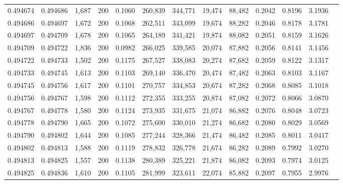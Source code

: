 \begin{tabular}{rrrrrrrrrrrrr}
0.494674 & 0.494686 & 1,687 & 200 &                                     0.1060 & 260,839 & 344,771 &  19,474 &  88,482 & 0.2042 & 0.8196 & 3.1936 \\
0.494686 & 0.494697 & 1,672 & 200 &                                     0.1068 & 262,511 & 343,099 &  19,674 &  88,282 & 0.2046 & 0.8178 & 3.1781 \\
0.494697 & 0.494709 & 1,678 & 200 &                                     0.1065 & 264,189 & 341,421 &  19,874 &  88,082 & 0.2051 & 0.8159 & 3.1626 \\
0.494709 & 0.494722 & 1,836 & 200 &                                     0.0982 & 266,025 & 339,585 &  20,074 &  87,882 & 0.2056 & 0.8141 & 3.1456 \\
0.494722 & 0.494733 & 1,502 & 200 &                                     0.1175 & 267,527 & 338,083 &  20,274 &  87,682 & 0.2059 & 0.8122 & 3.1317 \\
0.494733 & 0.494745 & 1,613 & 200 &                                     0.1103 & 269,140 & 336,470 &  20,474 &  87,482 & 0.2063 & 0.8103 & 3.1167 \\
0.494745 & 0.494756 & 1,617 & 200 &                                     0.1101 & 270,757 & 334,853 &  20,674 &  87,282 & 0.2068 & 0.8085 & 3.1018 \\
0.494756 & 0.494767 & 1,598 & 200 &                                     0.1112 & 272,355 & 333,255 &  20,874 &  87,082 & 0.2072 & 0.8066 & 3.0870 \\
0.494767 & 0.494778 & 1,580 & 200 &                                     0.1124 & 273,935 & 331,675 &  21,074 &  86,882 & 0.2076 & 0.8048 & 3.0723 \\
0.494778 & 0.494790 & 1,665 & 200 &                                     0.1072 & 275,600 & 330,010 &  21,274 &  86,682 & 0.2080 & 0.8029 & 3.0569 \\
0.494790 & 0.494802 & 1,644 & 200 &                                     0.1085 & 277,244 & 328,366 &  21,474 &  86,482 & 0.2085 & 0.8011 & 3.0417 \\
0.494802 & 0.494813 & 1,588 & 200 &                                     0.1119 & 278,832 & 326,778 &  21,674 &  86,282 & 0.2089 & 0.7992 & 3.0270 \\
0.494813 & 0.494825 & 1,557 & 200 &                                     0.1138 & 280,389 & 325,221 &  21,874 &  86,082 & 0.2093 & 0.7974 & 3.0125 \\
0.494825 & 0.494836 & 1,610 & 200 &                                     0.1105 & 281,999 & 323,611 &  22,074 &  85,882 & 0.2097 & 0.7955 & 2.9976 \\

\end{tabular}
